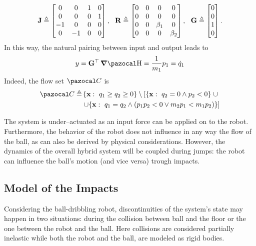 \begin{equation}
    \mathbf{J}\triangleq
    \begin{bmatrix}
        0&0&1&0\\
        0&0&0&1\\
        -1&0&0&0\\
        0&-1&0&0
    \end{bmatrix},~~
    \mathbf{R}\triangleq
    \begin{bmatrix}
        0&0&0&0\\
        0&0&0&0\\
        0&0&\beta_1&0\\
        0&0&0&\beta_2
    \end{bmatrix},~~
    \mathbf{G}\triangleq
    \begin{bmatrix}
        0\\0\\1\\0
    \end{bmatrix}.
\end{equation}
%
In this way, the natural pairing between input and output leads to
%
\begin{equation}
    y = \Gb^\top\dH= \frac{1}{m_1}p_1=\dot{q}_1
\end{equation}
%
Indeed, the flow set $\C$ is 
%
\begin{align}\label{eq:flowset}
    \C \triangleq &\left\{\xb:~q_1\geq q_2\geq 0\right\}\setminus\left[\left\{\xb:~q_2 = 0\land p_2<0\right\}\right.\cup\\
    &\left.\cup\{\xb:~q_1 = q_2\land (p_1p_2<0\lor m_2p_1< m_1p_2)\}\right]
\end{align}
%
\begin{rmk}
    The system is under--actuated as an input force can be applied on to the robot. Furthermore, the behavior of the robot does not influence in any way the flow of the ball, as can also be derived by physical considerations. However, the dynamics of the overall hybrid system will be coupled during jumps: the robot can influence the ball's motion (and vice versa) trough impacts.
\end{rmk}
%
\subsection{Model of the Impacts}
%
Considering the ball-dribbling robot, discontinuities of the system's state may happen in two situations: during the collision between ball and the floor or the one between the robot and the ball. Here collisions are considered partially inelastic while both the robot and the ball, are modeled as rigid bodies.
%
